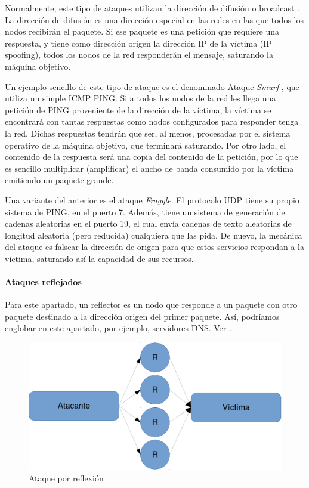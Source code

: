 Normalmente, este tipo de ataques utilizan la dirección de difusión o broadcast  . La 
dirección de difusión es una dirección especial en las redes en las que todos los nodos recibirán el paquete. Si ese 
paquete es una petición que requiere una respuesta, y tiene como dirección origen la dirección IP de la víctima (IP 
spoofing), todos los nodos de la red responderán el mensaje, saturando la máquina objetivo.

Un ejemplo sencillo de este tipo de ataque es el denominado Ataque \emph{Smurf} , que utiliza un 
simple \gls{ICMP} PING. Si a todos los nodos de la red les llega una petición de PING 
proveniente de la dirección de la víctima, la víctima se encontrará con tantas respuestas como nodos configurados para 
responder tenga la red. Dichas respuestas tendrán que ser, al menos, procesadas por el sistema operativo de la máquina 
objetivo, que terminará saturando. Por otro lado, el contenido de la respuesta será una copia del contenido de la 
petición, por lo que es sencillo multiplicar (amplificar) el ancho de banda consumido por la víctima emitiendo un 
paquete grande.

Una variante del anterior es el ataque \emph{Fraggle}. El protocolo \gls{UDP} tiene su propio sistema de PING, en 
el puerto 7. Además, tiene un sistema de generación de cadenas aleatorias en el puerto 19, el cual envía cadenas de 
texto aleatorias de longitud aleatoria (pero reducida) cualquiera que las pida. De nuevo, la mecánica del ataque es 
falsear la dirección de origen para que estos servicios respondan a la víctima, saturando así la capacidad de sus 
recursos.

\paragraph{Ataques reflejados}\mbox{\newline} 

\noindent Para este apartado, un reflector es un nodo que responde a un paquete con otro paquete destinado a la 
dirección origen del primer paquete. Así, podríamos englobar en este apartado, por ejemplo, servidores \gls{DNS}. 
Ver .

\begin{figure}[htbp]
\centering
\includegraphics[width=.8\textwidth]{CapituloDDoS/Figuras/Reflexion}
\caption{Ataque por reflexión}
\end{figure}
%

